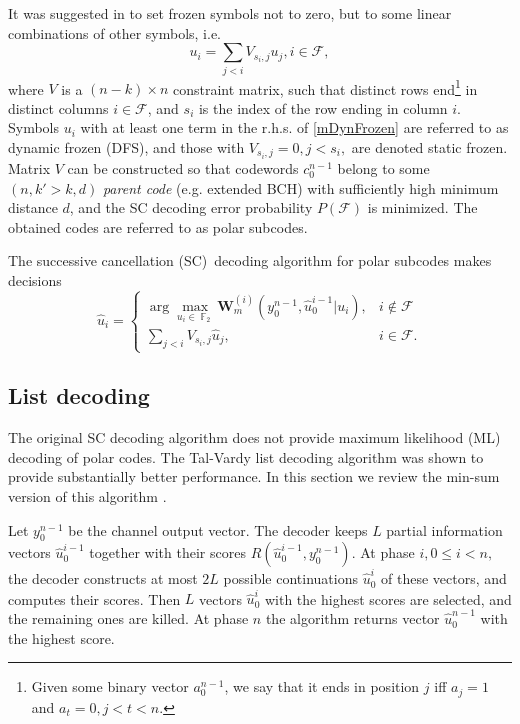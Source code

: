 \documentclass[conference]{IEEEtran}
\DeclareMathOperator{\F}{\mathbb F}
\theoremstyle{plain}
\newcommand{\mF}{\mathcal F}
\begin{document}
It was suggested in \cite{trifonov2016polar} to set frozen symbols not to zero, but to some linear combinations of other symbols, i.e. 
\begin{equation}
\label{mDynFrozen}
u_i=\sum_{j<i}V_{s_i,j}u_j,i\in \mF,
\end{equation}
where $V$ is a $(n-k)\times n$ constraint matrix, such that distinct rows end\footnote{Given some binary vector $a_0^{n-1}$, we say that it  ends in position $j$ iff $a_j=1$ and $a_t=0,  j<t<n$.
 } in distinct columns $i\in \mF$, and $s_i$ is the index of the row ending in column $i$.  Symbols $u_i$ with at least one term in the r.h.s. of \eqref{mDynFrozen} are referred to as dynamic frozen (DFS), and those with $V_{s_i,j}=0,j<s_i,$ are denoted static frozen. Matrix $V$ can be constructed so that codewords $c_0^{n-1}$ belong to some $(n,k'>k,d)$ {\em parent code} (e.g. extended BCH) with sufficiently high minimum distance $d$, and the SC decoding error probability $P(\mF)$ is minimized. The obtained codes are referred to as polar subcodes. 

The successive cancellation (SC)\ decoding algorithm for polar subcodes makes decisions 
\begin{equation}
\label{mSC}
\hat u_i=\begin{cases}
\arg \max_{u_i\in \F_2}\mathbf W_m^{(i)}(y_0^{n-1},\hat u_0^{i-1}|u_i),&i\notin \mF\\
\sum_{j<i}V_{s_i,j}\hat u_j,&i\in \mF.
\end{cases}
\end{equation}

\subsection{List decoding}
The original SC decoding algorithm does not provide maximum likelihood (ML) decoding of polar codes. The Tal-Vardy list decoding algorithm \cite{tal2015list} was shown to provide substantially better performance. In this section we review the min-sum version of this algorithm \cite{balatsoukasstimming2015llrbased}.

Let $y_0^{n-1}$ be the channel output vector.
The decoder keeps $L$ partial information vectors $\hat u_0^{i-1}$ together with their scores $R(\hat u_0^{i-1},y_0^{n-1})$. At  phase $i, 0\leq i<n,$ the decoder constructs at most $2L$ possible continuations $\hat u_0^i$ of these vectors, and computes their scores. Then $L$ vectors $\hat u_0^i$ with the highest scores are selected, and the remaining ones are killed. At phase $n$ the algorithm returns vector $\hat u_0^{n-1}$ with the highest score.
 
\end{document}
